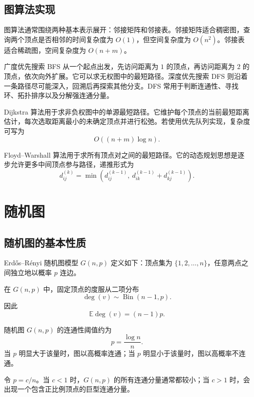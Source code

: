 \subsection*{图算法实现}

图算法通常围绕两种基本表示展开：邻接矩阵和邻接表。邻接矩阵适合稠密图，查询两个顶点是否相邻的时间复杂度为 $O(1)$，但空间复杂度为 $O(n^2)$。邻接表适合稀疏图，空间复杂度为 $O(n+m)$。

广度优先搜索 BFS 从一个起点出发，先访问距离为 $1$ 的顶点，再访问距离为 $2$ 的顶点，依次向外扩展。它可以求无权图中的最短路径。深度优先搜索 DFS 则沿着一条路径尽可能深入，回溯后再探索其他分支。DFS 常用于判断连通性、寻找环、拓扑排序以及分解强连通分量。

Dijkstra 算法用于求非负权图中的单源最短路径。它维护每个顶点的当前最短距离估计，每次选取距离最小的未确定顶点并进行松弛。若使用优先队列实现，复杂度可写为
\[
    O((n+m)\log n).
\]

Floyd--Warshall 算法用于求所有顶点对之间的最短路径。它的动态规划思想是逐步允许更多中间顶点参与路径，递推形式为
\[
    d_{ij}^{(k)}=\min\left(d_{ij}^{(k-1)},\ d_{ik}^{(k-1)}+d_{kj}^{(k-1)}\right).
\]

\section{随机图}

\subsection{随机图的基本性质}

Erd\H{o}s--R\'enyi 随机图模型 $G(n,p)$ 定义如下：顶点集为 $\{1,2,\dots,n\}$，任意两点之间独立地以概率 $p$ 连边。

\begin{theorem}[$G(n,p)$ 的度分布]
在 $G(n,p)$ 中，固定顶点的度服从二项分布
\[
    \deg(v)\sim \operatorname{Bin}(n-1,p).
\]
因此
\[
    \mathbb{E}\deg(v)=(n-1)p.
\]
\end{theorem}

\begin{theorem}[连通性阈值]
随机图 $G(n,p)$ 的连通性阈值约为
\[
    p=\frac{\log n}{n}.
\]
当 $p$ 明显大于该量时，图以高概率连通；当 $p$ 明显小于该量时，图以高概率不连通。
\end{theorem}

\begin{theorem}[巨型分量的出现]
令 $p=c/n$。当 $c<1$ 时，$G(n,p)$ 的所有连通分量通常都较小；当 $c>1$ 时，会出现一个包含正比例顶点的巨型连通分量。
\end{theorem}

